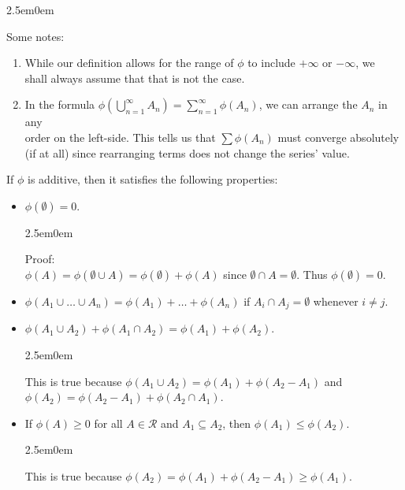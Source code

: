 \documentclass{book}
\newcommand{\hTwo}{%
   \color{MidnightBlue}%
   \fontsize{13}{15}\selectfont%
}
\newcommand{\hThree}{%
   \color{PineGreen!85!Orange}
   \fontsize{13}{15}\selectfont%
}
\newenvironment{myIndent}{%
   \begin{adjustwidth}{2.5em}{0em}%
}{%
   \end{adjustwidth}%
}
\newcommand{\retTwo}{\hfill\bigbreak}
\begin{document}
{\begin{myIndent}\hTwo
   Some notes:
   \begin{enumerate}
      \item While our definition allows for the range of $\phi$ to include $+\infty$ or $-\infty$, we\\ shall always assume that that is not the case.\retTwo
      
      \item In the formula $\phi\left(\bigcup\limits_{n=1}^\infty A_n\right) = \sum\limits_{n=1}^\infty \phi(A_n)$, we can arrange the $A_n$ in any\\ order on the left-side. This tells us that $\sum \phi(A_n)$ must converge absolutely\\ [8pt] (if at all) since rearranging terms does not change the series' value.\\ [6pt]
   \end{enumerate}

   If $\phi$ is additive, then it satisfies the following properties:
   \begin{itemize}
      \item $\phi(\emptyset) = 0$.
      {\begin{myIndent}\hThree
         Proof:\\ $\phi(A) = \phi(\emptyset \cup A) = \phi(\emptyset) + \phi(A)$ since $\emptyset \cap A = \emptyset$. Thus $\phi(\emptyset) = 0$.\retTwo
      \end{myIndent}}

      \item $\phi(A_1 \cup \ldots \cup A_n) = \phi(A_1) + \ldots + \phi(A_n)$ if $A_i \cap A_j = \emptyset$ whenever $i \neq j$.\retTwo
      
      \item $\phi(A_1 \cup A_2) + \phi(A_1 \cap A_2) = \phi(A_1) + \phi(A_2)$.
      {\begin{myIndent}\hThree
         This is true because $\phi(A_1 \cup A_2) = \phi(A_1) + \phi(A_2 - A_1)$ and\\ $\phi(A_2) = \phi(A_2 - A_1) + \phi(A_2 \cap A_1)$.\retTwo
      \end{myIndent}}

      \item If $\phi(A) \geq 0$ for all $A \in \mathcal{R}$ and $A_1 \subseteq A_2$, then $\phi(A_1) \leq \phi(A_2)$.
      {\begin{myIndent}\hThree
         This is true because $\phi(A_2) = \phi(A_1) + \phi(A_2 - A_1) \geq \phi(A_1)$.
         

\end{myIndent}}
\end{itemize}
\end{myIndent}}
\end{document}

